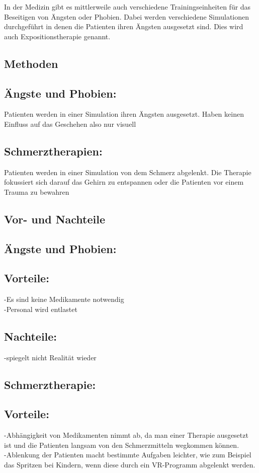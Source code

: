 
In der Medizin gibt es mittlerweile auch verschiedene Trainingseinheiten für das Beseitigen von Ängsten oder Phobien. Dabei werden verschiedene Simulationen durchgeführt in denen die Patienten ihren Ängsten ausgesetzt sind. Dies wird auch Expositionstherapie genannt.\\

\subsection{Methoden}
\subsection{Ängste und Phobien:}
Patienten werden in einer Simulation ihren Ängsten ausgesetzt. Haben keinen Einfluss auf das Geschehen also nur visuell\\

\subsection{Schmerztherapien:}
Patienten werden in einer Simulation von dem Schmerz abgelenkt. Die Therapie fokussiert sich darauf das Gehirn zu entspannen oder die Patienten vor einem Trauma zu bewahren\\

\subsection{Vor- und Nachteile}
\subsection{Ängste und Phobien:}
\subsection{Vorteile:}
-Es sind keine Medikamente notwendig\\
-Personal wird entlastet\\
\subsection{Nachteile:}
-spiegelt nicht Realität wieder\\

\subsection{Schmerztherapie:}
\subsection{Vorteile:}
-Abhängigkeit von Medikamenten nimmt ab, da man einer Therapie ausgesetzt ist und die Patienten langsam von den Schmerzmitteln wegkommen können.\\
-Ablenkung der Patienten macht bestimmte Aufgaben leichter, wie zum Beispiel das Spritzen bei Kindern, wenn diese durch ein VR-Programm abgelenkt werden.\\

